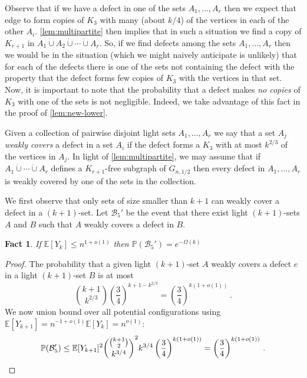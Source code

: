 \documentclass[11pt]{article}
\newtheorem{fact}[theorem]{Fact}
\theoremstyle{definition}
\theoremstyle{remark}
\newcommand{\EE}{\mathbb{E}}
\newcommand{\E}{\mathbb{E}}
\newcommand{\PP}{\mathbb{P}}
\newcommand{\cB}{\mathcal{B}}
\begin{document}
\noindent
Observe that if we have a defect in one of the sets $ A_1, \dots ,A_r$ then we
expect that edge to form copies of $K_3$ with many (about $k/4$) of the vertices
in each of the other $A_i$. \cref{lem:multipartite} then implies that in such a situation
we find a copy of $K_{r+1}$ in $ A_1 \dot\cup A_2 \dot\cup \dotsm \dot\cup A_r$. So, if we find defects among the sets $A_1, \dots, A_r$ then we would
be in the situation (which we might naively anticipate is unlikely) that for each of the defects there is one of the sets not containing the defect with the property
that the defect forms few copies of $K_3$ with the vertices in that set. Now, it is important to note that the probability that a defect makes
\emph{no copies} of $K_3$ with one of the sets is not negligible. Indeed, we take
advantage of this fact in the proof of \cref{lem:new-lower}.


Given a collection of pairwise disjoint light sets $ A_1, \dots, A_r$ we say that a set $A_j$ \emph{weakly covers} a defect in a set
$A_i$ if the defect forms a $K_3$ with at most $ k^{2/3}$ of the vertices in $A_j$. 
In light of \cref{lem:multipartite}, we may assume
that if $ A_1 \dot\cup \dotsm \dot\cup A_r$ defines a $K_{r+1}$-free subgraph of $ G_{n,1/2}$ then every defect in 
$ A_1, \dots, A_r$ is weakly covered by one of the sets in the collection.


We first observe that only sets of size smaller than $k+1$ can weakly cover a defect in a $(k+1)$-set.  Let $\cB_5'$ be the event that there exist light $(k+1)$-sets $A$ and $B$ such that $A$ weakly covers a defect in $B$.  

\begin{fact}\label{fact:k+1-do-not-cover}
     If $\E [Y_k] \leq n^{1 + o(1)}$ then $\PP(\cB_5') = e^{-\Omega(k)}$
\end{fact}
\begin{proof}
    The probability that a given light $(k+1)$-set $A$ weakly covers a defect $e$ in a light $(k+1)$-set $B$ is at most $$\binom{k+1}{k^{2/3}} \left( \frac{3}{4} \right)^{k + 1 - k^{2/3}} = \left(\frac{3}{4} \right)^{k(1 + o(1))}\,.$$
    We now union bound over all potential configurations using $\E[Y_{k+1}]=n^{-1+o(1)}\E [Y_k] = n^{o(1)}$:
    \begin{equation*}
        \PP(\cB_5') \leq \EE[ Y_{k+1}]^2 \binom{ \binom{k+1}{2}}{ k^{3/4}}^2 k^{3/4} \left(\frac{3}{4} \right)^{k(1+o(1))} = \left(\frac{3}{4}\right)^{k(1 + o(1))}\,. \qedhere
    \end{equation*}
\end{proof}
\end{document}
